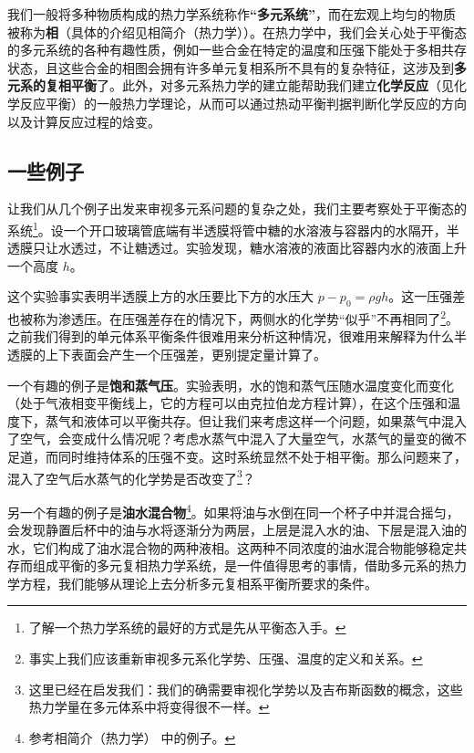 
我们一般将多种物质构成的热力学系统称作\textbf{“多元系统”}，而在宏观上均匀的物质被称为\textbf{相}（具体的介绍见相简介（热力学））。在热力学中，我们会关心处于平衡态的多元系统的各种有趣性质，例如一些合金在特定的温度和压强下能处于多相共存状态，且这些合金的相图会拥有许多单元复相系所不具有的复杂特征，这涉及到\textbf{多元系的复相平衡}了。此外，对多元系热力学的建立能帮助我们建立\textbf{化学反应}（见化学反应平衡）的一般热力学理论，从而可以通过热动平衡判据判断化学反应的方向以及计算反应过程的焓变。
\subsection{一些例子}
让我们从几个例子出发来审视多元系问题的复杂之处，我们主要考察处于平衡态的系统\footnote{了解一个热力学系统的最好的方式是先从平衡态入手。}。设一个开口玻璃管底端有半透膜将管中糖的水溶液与容器内的水隔开，半透膜只让水透过，不让糖透过。实验发现，糖水溶液的液面比容器内水的液面上升一个高度 $h$。

这个实验事实表明半透膜上方的水压要比下方的水压大 $p-p_0=\rho g h$。这一压强差也被称为渗透压。在压强差存在的情况下，两侧水的化学势“似乎”不再相同了\footnote{事实上我们应该重新审视多元系化学势、压强、温度的定义和关系。}。之前我们得到的单元体系平衡条件很难用来分析这种情况，很难用来解释为什么半透膜的上下表面会产生一个压强差，更别提定量计算了。

一个有趣的例子是\textbf{饱和蒸气压}。实验表明，水的饱和蒸气压随水温度变化而变化（处于气液相变平衡线上，它的方程可以由克拉伯龙方程计算），在这个压强和温度下，蒸气和液体可以平衡共存。但让我们来考虑这样一个问题，如果蒸气中混入了空气，会变成什么情况呢？考虑水蒸气中混入了大量空气，水蒸气的量变的微不足道，而同时维持体系的压强不变。这时系统显然不处于相平衡。那么问题来了，混入了空气后水蒸气的化学势是否改变了\footnote{这里已经在启发我们：我们的确需要审视化学势以及吉布斯函数的概念，这些热力学量在多元体系中将变得很不一样。}？

另一个有趣的例子是\textbf{油水混合物}\footnote{参考相简介（热力学） 中的例子。}。如果将油与水倒在同一个杯子中并混合摇匀，会发现静置后杯中的油与水将逐渐分为两层，上层是混入水的油、下层是混入油的水，它们构成了油水混合物的两种液相。这两种不同浓度的油水混合物能够稳定共存而组成平衡的多元复相热力学系统，是一件值得思考的事情，借助多元系的热力学方程，我们能够从理论上去分析多元复相系平衡所要求的条件。

